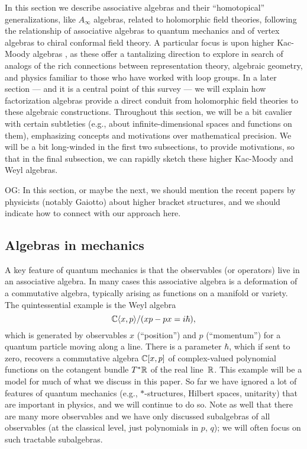 \documentclass[11pt]{amsart}
\def\owen#1{{\textcolor{violet!50!black}{OG: {#1}}}}
\begin{document}
In this section we describe  associative algebras and their ``homotopical'' generalizations, like $A_\infty$ algebras, related to holomorphic field theories,
following the relationship of associative algebras to quantum mechanics and of vertex algebras to chiral conformal field theory.
A particular focus is upon higher Kac-Moody algebras \cite{FHK},
as these offer a tantalizing direction to explore in search of analogs of the rich connections between representation theory, algebraic geometry, and physics familiar to those who have worked with loop groups.
In a later section --- and it is a central point of this survey --- we will explain how factorization algebras provide a direct conduit from holomorphic field theories to these algebraic constructions.
Throughout this section, we will be a bit cavalier with certain subtleties (e.g., about infinite-dimensional spaces and functions on them), 
emphasizing concepts and motivations over mathematical precision.
We will be a bit long-winded in the first two subsections, to provide motivations,
so that in the final subsection, we can rapidly sketch these higher Kac-Moody and Weyl algebras.

\owen{In this section, or maybe the next, we should mention the recent papers by physicists (notably Gaiotto) about higher bracket structures, and we should indicate how to connect with our approach here.}

\subsection{Algebras in mechanics}

A key feature of quantum mechanics is that the observables (or operators) live in an associative algebra.
In many cases this associative algebra is a deformation of a commutative algebra, typically arising as functions on a manifold or variety.
The quintessential example is the Weyl algebra
\[
\mathbb C \langle x, p \rangle /(xp - px = i \hbar),
\] 
which is generated by observables $x$ (``position'') and $p$ (``momentum'') for a quantum particle moving along a line.
There is a parameter $\hbar$, which if sent to zero, recovers a commutative algebra $\mathbb C [ x, p ]$ of complex-valued polynomial functions on the cotangent bundle $T^* \mathbb R$ of the real line~$\mathbb R$.
This example will be a model for much of what we discuss in this paper.
So far we have ignored a lot of features of quantum mechanics (e.g., $\ast$-structures, Hilbert spaces, unitarity) that are important in physics,
and we will continue to do so.
Note as well that there are many more observables and we have only discussed subalgebras of all observables (at the classical level, just polynomials in $p$, $q$);
we will often focus on such tractable subalgebras. 
\end{document}
